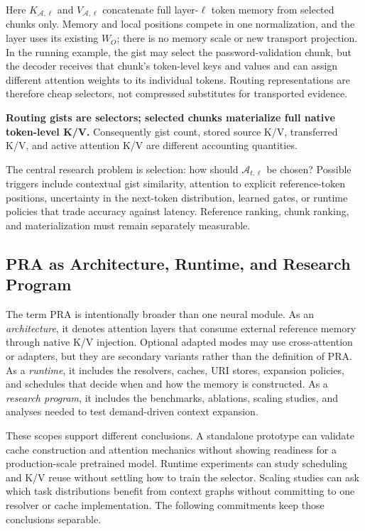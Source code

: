 \documentclass[11pt]{article}
\begin{document}
Here $K_{\mathcal{A},\ell}$ and $V_{\mathcal{A},\ell}$ concatenate full layer-$\ell$
token memory from selected chunks only. Memory and local positions compete in one
normalization, and the layer uses its existing $W_O$; there is no memory scale or new
transport projection. In
the running example, the gist may select the password-validation chunk, but the decoder
receives that chunk's token-level keys and values and can assign different attention
weights to its individual tokens.  Routing representations are therefore cheap
selectors, not compressed substitutes for transported evidence.

\textbf{Routing gists are selectors; selected chunks materialize full native token-level
K/V.} Consequently gist count, stored source K/V, transferred K/V, and active attention
K/V are different accounting quantities.

The central research problem is selection: how should $\mathcal{A}_{t,\ell}$ be chosen? Possible triggers include contextual gist similarity, attention to explicit reference-token positions, uncertainty in the next-token distribution, learned gates, or runtime policies that trade accuracy against latency. Reference ranking, chunk ranking, and materialization must remain separately measurable.

\subsection{PRA as Architecture, Runtime, and Research Program}

The term PRA is intentionally broader than one neural module.  As an
\emph{architecture}, it denotes attention layers that consume external reference memory
through native K/V injection. Optional adapted modes may use cross-attention or adapters,
but they are secondary variants rather than the definition of PRA.
As a \emph{runtime}, it includes the resolvers, caches, URI stores, expansion policies,
and schedules that decide when and how the memory is constructed.  As a \emph{research
program}, it includes the benchmarks, ablations, scaling studies, and analyses needed to
test demand-driven context expansion.

These scopes support different conclusions.  A standalone prototype can validate cache
construction and attention mechanics without showing readiness for a production-scale
pretrained model.  Runtime experiments can study scheduling and K/V reuse without
settling how to train the selector.  Scaling studies can ask which task distributions
benefit from context graphs without committing to one resolver or cache implementation.
The following commitments keep those conclusions separable.
\end{document}
